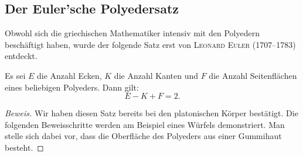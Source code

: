 \documentclass[%
11pt,%
twoside,%
titlepage,%
a4page,%
german,%
headsepline%
]{scrartcl}
\begin{document}
\subsection{Der Euler'sche Polyedersatz}
Obwohl sich die griechischen Mathematiker intensiv mit den Polyedern besch\"aftigt haben, wurde der folgende Satz erst von \textsc{Leonard Euler} (1707--1783) entdeckt.
\begin{satz}
Es sei $E$ die Anzahl Ecken, $K$ die Anzahl Kanten und $F$ die Anzahl Seitenfl\"achen eines beliebigen Polyeders. Dann gilt:
$$E-K+F=2.$$
\end{satz}
\begin{proof}[Beweis]
Wir haben diesen Satz bereits bei den platonischen K\"orper best\"atigt. Die folgenden Beweisschritte werden am Beispiel eines W\"urfels demonstriert. Man stelle sich dabei vor, dass die Oberfl\"ache des Polyeders aus einer Gummihaut besteht.


\end{proof}
\end{document}

